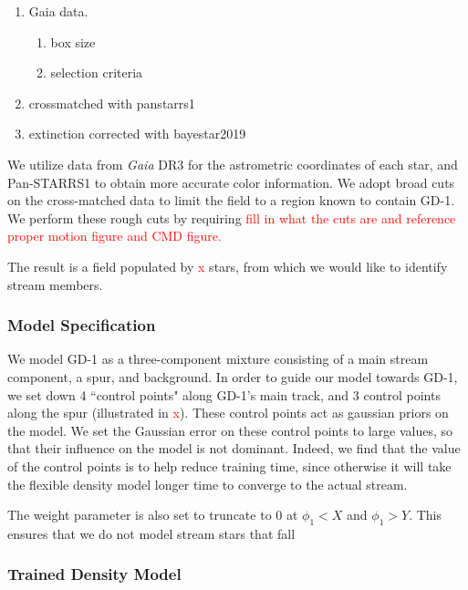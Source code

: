 \documentclass[twocolumn]{aastex631}
\newcommand{\TODO}[1]{{\textcolor{red}{#1}}}
\newcommand{\JN}[1]{\TODO{#1}}
\begin{document}
            \begin{enumerate}
                \item Gaia data.
                    \begin{enumerate}
                        \item box size
                        \item selection criteria
                    \end{enumerate}
                \item crossmatched with panstarrs1
                \item extinction corrected with bayestar2019
            \end{enumerate}

            We utilize data from {\it Gaia} DR3 for the astrometric coordinates of each star, and Pan-STARRS1 to obtain more accurate color information. We adopt broad cuts on the cross-matched data to limit the field to a region known to contain GD-1. We perform these rough cuts by requiring \JN{fill in what the cuts are and reference proper motion figure and CMD figure.} 

            The result is a field populated by \JN{x} stars, from which we would like to identify stream members.

        \subsubsection{Model Specification}\label{sec:GD_1_ModelSpecification}
    
            We model GD-1 as a three-component mixture consisting of a main stream component, a spur, and background. In order to guide our model towards GD-1, we set down 4 ``control points" along GD-1's main track, and 3 control points along the spur (illustrated in \JN{x}). These control points act as gaussian priors on the model. We set the Gaussian error on these control points to large values, so that their influence on the model is not dominant. Indeed, we find that the value of the control points is to help reduce training time, since otherwise it will take the flexible density model longer time to converge to the actual stream.
    
            The weight parameter is also set to truncate to $0$ at $\phi_1 < X$ and $\phi_1 > Y$. This ensures that we do not model stream stars that fall 
        
        
        \subsubsection{Trained Density Model}\label{ssub:trained_gd1}
    
\end{document}
